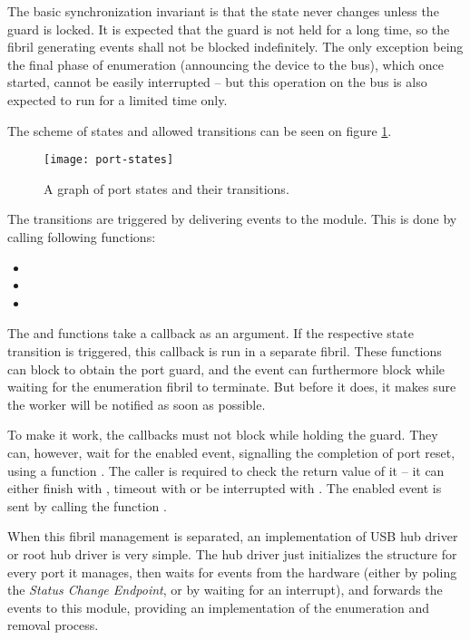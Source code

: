 The basic synchronization invariant is that the state never changes unless the
guard is locked. It is expected that the guard is not held for a long time, so
the fibril generating events shall not be blocked indefinitely. The only
exception being the final phase of enumeration (announcing the device to the
bus), which once started, cannot be easily interrupted -- but this operation on
the bus is also expected to run for a limited time only.

The scheme of states and allowed transitions can be seen on figure
\ref{fig:port-states}.

\begin{figure}[h]
	\centering
	\texttt{[image: port-states]}
	\caption{A graph of port states and their transitions.}
	\label{fig:port-states}
\end{figure}

The transitions are triggered by delivering events to the module. This is done
by calling following functions:

\begin{itemize}
	\item {}
	\item {}
	\item {}
\end{itemize}

The  and  functions take a callback as an
argument. If the respective state transition is triggered, this callback is run
in a separate fibril. These functions can block to obtain the port guard, and
the  event can furthermore block while waiting for the
enumeration fibril to terminate. But before it does, it makes sure the worker
will be notified as soon as possible.

To make it work, the callbacks must not block while holding the guard. They
can, however, wait for the enabled event, signalling the completion of port
reset, using a function . The caller is required
to check the return value of it -- it can either finish with ,
timeout with  or be interrupted with . The enabled
event is sent by calling the function .

When this fibril management is separated, an implementation of USB hub driver or
root hub driver is very simple. The hub driver just initializes the
 structure for every port it manages, then waits for events
from the hardware (either by poling the \textit{Status Change Endpoint}, or by
waiting for an interrupt), and forwards the events to this module, providing an
implementation of the enumeration and removal process.


